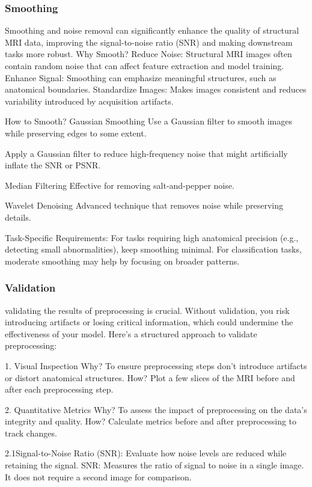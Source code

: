 \subsubsection{Smoothing}

Smoothing and noise removal can significantly enhance the quality of structural MRI data, improving the signal-to-noise ratio (SNR) and making downstream tasks more robust.
Why Smooth?
Reduce Noise: Structural MRI images often contain random noise that can affect feature extraction and model training.
Enhance Signal: Smoothing can emphasize meaningful structures, such as anatomical boundaries.
Standardize Images: Makes images consistent and reduces variability introduced by acquisition artifacts.

How to Smooth?
Gaussian Smoothing 
Use a Gaussian filter to smooth images while preserving edges to some extent.

Apply a Gaussian filter to reduce high-frequency noise that might artificially inflate the SNR or PSNR.

Median Filtering
Effective for removing salt-and-pepper noise.

Wavelet Denoising
Advanced technique that removes noise while preserving details.

Task-Specific Requirements:
For tasks requiring high anatomical precision (e.g., detecting small abnormalities), keep smoothing minimal.
For classification tasks, moderate smoothing may help by focusing on broader patterns.

\subsubsection{Validation}

validating the results of preprocessing is crucial. Without validation, you risk introducing artifacts or losing critical information, which could undermine the effectiveness of your model. Here’s a structured approach to validate preprocessing:

1. Visual Inspection
Why? To ensure preprocessing steps don't introduce artifacts or distort anatomical structures.
How?
Plot a few slices of the MRI before and after each preprocessing step.

2. Quantitative Metrics
Why? To assess the impact of preprocessing on the data's integrity and quality.
How?
Calculate metrics before and after preprocessing to track changes.

2.1Signal-to-Noise Ratio (SNR):
Evaluate how noise levels are reduced while retaining the signal.
SNR: Measures the ratio of signal to noise in a single image. It does not require a second image for comparison.

